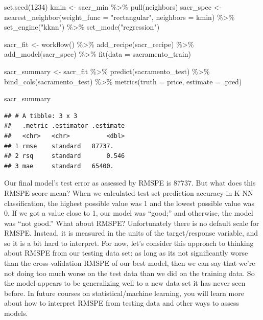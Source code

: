 \documentclass[
]{krantz}
\makeatletter
\newenvironment{Shaded}{\begin{snugshade}}{\end{snugshade}}
\newcommand{\AttributeTok}[1]{\textcolor[rgb]{0.61,0.61,0.61}{#1}}
\newcommand{\DecValTok}[1]{\textcolor[rgb]{0.06,0.06,0.06}{#1}}
\newcommand{\FunctionTok}[1]{\textcolor[rgb]{0,0,0}{#1}}
\newcommand{\NormalTok}[1]{#1}
\newcommand{\OtherTok}[1]{\textcolor[rgb]{0.37,0.37,0.37}{#1}}
\newcommand{\SpecialCharTok}[1]{\textcolor[rgb]{0,0,0}{#1}}
\newcommand{\StringTok}[1]{\textcolor[rgb]{0.5,0.5,0.5}{#1}}
\newenvironment{kframe}{%
\medskip{}
\setlength{\fboxsep}{.8em}
 \def\at@end@of@kframe{}%
 \ifinner\ifhmode%
  \def\at@end@of@kframe{\end{minipage}}%
  \begin{minipage}{\columnwidth}%
 \fi\fi%
 \def\FrameCommand##1{\hskip\@totalleftmargin \hskip-\fboxsep
 \colorbox{shadecolor}{##1}\hskip-\fboxsep
     \hskip-\linewidth \hskip-\@totalleftmargin \hskip\columnwidth}%
 \MakeFramed {\advance\hsize-\width
   \@totalleftmargin\z@ \linewidth\hsize
   \@setminipage}}%
 {\par\unskip\endMakeFramed%
 \at@end@of@kframe}
\renewenvironment{Shaded}{\begin{kframe}}{\end{kframe}}
\makeatother
\begin{document}
\begin{Shaded}
\begin{Highlighting}[]
\FunctionTok{set.seed}\NormalTok{(}\DecValTok{1234}\NormalTok{)}
\NormalTok{kmin }\OtherTok{\textless{}{-}}\NormalTok{ sacr\_min }\SpecialCharTok{\%\textgreater{}\%} \FunctionTok{pull}\NormalTok{(neighbors)}
\NormalTok{sacr\_spec }\OtherTok{\textless{}{-}} \FunctionTok{nearest\_neighbor}\NormalTok{(}\AttributeTok{weight\_func =} \StringTok{"rectangular"}\NormalTok{, }\AttributeTok{neighbors =}\NormalTok{ kmin) }\SpecialCharTok{\%\textgreater{}\%}
  \FunctionTok{set\_engine}\NormalTok{(}\StringTok{"kknn"}\NormalTok{) }\SpecialCharTok{\%\textgreater{}\%}
  \FunctionTok{set\_mode}\NormalTok{(}\StringTok{"regression"}\NormalTok{)}

\NormalTok{sacr\_fit }\OtherTok{\textless{}{-}} \FunctionTok{workflow}\NormalTok{() }\SpecialCharTok{\%\textgreater{}\%}
  \FunctionTok{add\_recipe}\NormalTok{(sacr\_recipe) }\SpecialCharTok{\%\textgreater{}\%}
  \FunctionTok{add\_model}\NormalTok{(sacr\_spec) }\SpecialCharTok{\%\textgreater{}\%}
  \FunctionTok{fit}\NormalTok{(}\AttributeTok{data =}\NormalTok{ sacramento\_train)}

\NormalTok{sacr\_summary }\OtherTok{\textless{}{-}}\NormalTok{ sacr\_fit }\SpecialCharTok{\%\textgreater{}\%}
  \FunctionTok{predict}\NormalTok{(sacramento\_test) }\SpecialCharTok{\%\textgreater{}\%}
  \FunctionTok{bind\_cols}\NormalTok{(sacramento\_test) }\SpecialCharTok{\%\textgreater{}\%}
  \FunctionTok{metrics}\NormalTok{(}\AttributeTok{truth =}\NormalTok{ price, }\AttributeTok{estimate =}\NormalTok{ .pred)}

\NormalTok{sacr\_summary}
\end{Highlighting}
\end{Shaded}

\begin{verbatim}
## # A tibble: 3 x 3
##   .metric .estimator .estimate
##   <chr>   <chr>          <dbl>
## 1 rmse    standard   87737.   
## 2 rsq     standard       0.546
## 3 mae     standard   65400.
\end{verbatim}

Our final model's test error as assessed by RMSPE
is 87737.
But what does this RMSPE score mean? When we calculated test set prediction accuracy in K-NN
classification, the highest possible value was 1 and the lowest possible value was 0.
If we got a value close to 1, our model was ``good;'' and otherwise,
the model was ``not good.'' What about RMSPE? Unfortunately there is no default scale
for RMSPE. Instead, it is measured in
the units of the target/response variable, and so it is a bit hard to
interpret. For now, let's consider this approach to thinking about RMSPE from
our testing data set: as long as its not significantly worse than the cross-validation
RMSPE of our best model, then we can say that we're not doing too much worse on
the test data than we did on the training data. So the model appears to be
generalizing well to a new data set it has never seen before. In future courses
on statistical/machine learning, you will learn more about how to interpret RMSPE
from testing data and other ways to assess models.
\end{document}
